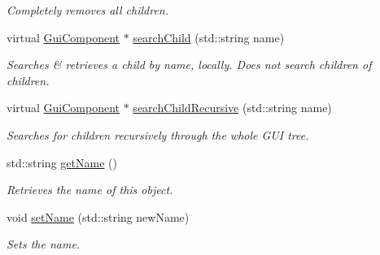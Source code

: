 \begin{DoxyCompactItemize}
\begin{DoxyCompactList}\small\item\em Completely removes all children. \end{DoxyCompactList}\item 
virtual \mbox{\hyperlink{class_gui_component}{Gui\+Component}} $\ast$ \mbox{\hyperlink{class_gui_component_a2167444f909f08b7be3805309d7ad831}{search\+Child}} (std\+::string name)
\begin{DoxyCompactList}\small\item\em Searches \& retrieves a child by name, locally. Does not search children of children. \end{DoxyCompactList}\item 
virtual \mbox{\hyperlink{class_gui_component}{Gui\+Component}} $\ast$ \mbox{\hyperlink{class_gui_component_a7f1e0e731d458135182850a53de06f95}{search\+Child\+Recursive}} (std\+::string name)
\begin{DoxyCompactList}\small\item\em Searches for children recursively through the whole G\+UI tree. \end{DoxyCompactList}\item 
std\+::string \mbox{\hyperlink{class_gui_component_a521f21d8ae5369fe255a1209fcd3bd0f}{get\+Name}} ()
\begin{DoxyCompactList}\small\item\em Retrieves the name of this object. \end{DoxyCompactList}\item 
void \mbox{\hyperlink{class_gui_component_ae673013e55aa98c6ee267fad3e282766}{set\+Name}} (std\+::string new\+Name)
\begin{DoxyCompactList}\small\item\em Sets the name. \end{DoxyCompactList}\end{DoxyCompactItemize}
